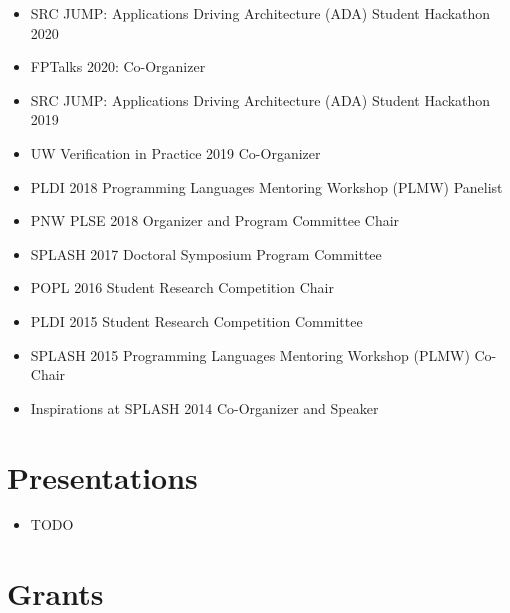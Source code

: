 \documentclass[10pt]{article}
\begin{document}
\begin{itemize}
  \item SRC JUMP: Applications Driving Architecture (ADA) Student Hackathon 2020
  \item FPTalks 2020: Co-Organizer
  \item SRC JUMP: Applications Driving Architecture (ADA) Student Hackathon 2019
  \item UW Verification in Practice 2019 Co-Organizer
  \item PLDI 2018 Programming Languages Mentoring Workshop (PLMW) Panelist
  \item PNW PLSE 2018 Organizer and Program Committee Chair
  \item SPLASH 2017 Doctoral Symposium Program Committee
  \item POPL 2016 Student Research Competition Chair
  \item PLDI 2015 Student Research Competition Committee
  \item SPLASH 2015 Programming Languages Mentoring Workshop (PLMW) Co-Chair
  \item Inspirations at SPLASH 2014 Co-Organizer and Speaker
\end{itemize}

\section*{Presentations}

\begin{itemize}
  \item TODO
\end{itemize}

\section*{Grants}
\end{document}
